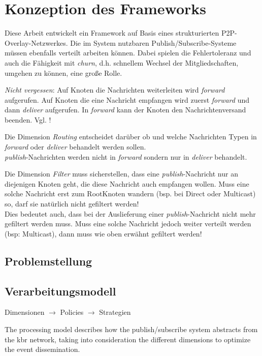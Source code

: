\chapter{Konzeption des Frameworks}
\label{chap:konzeption_pubsub}
Diese Arbeit entwickelt ein Framework auf Basis eines strukturierten P2P-Overlay-Netzwerkes. Die im System nutzbaren Publish/Subscribe-Systeme müssen ebenfalls verteilt arbeiten können. Dabei spielen die Fehlertoleranz und auch die Fähigkeit mit \emph{churn}, d.h. schnellem Wechsel der Mitgliedschaften, umgehen zu können, eine große Rolle.

\emph{Nicht vergessen}: Auf Knoten die Nachrichten weiterleiten wird \emph{forward} aufgerufen. Auf Knoten die eine Nachricht empfangen wird zuerst \emph{forward} und dann \emph{deliver} aufgerufen. In \emph{forward} kann der Knoten den Nachrichtenversand beenden. Vgl. !

Die Dimension \emph{Routing} entscheidet darüber ob und welche Nachrichten Typen in \emph{forward} oder \emph{deliver} behandelt werden sollen.\\
\emph{publish}-Nachrichten werden nicht in \emph{forward} sondern nur in \emph{deliver} behandelt.

Die Dimension \emph{Filter} muss sicherstellen, dass eine \emph{publish}-Nachricht nur an diejenigen Knoten geht, die diese Nachricht auch empfangen wollen. Muss eine solche Nachricht erst zum RootKnoten wandern (bsp. bei Direct oder Multicast) so, darf sie natürlich nicht gefiltert werden!\\
Dies bedeutet auch, dass bei der Auslieferung einer \emph{publish}-Nachricht nicht mehr gefiltert werden muss. Muss eine solche Nachricht jedoch weiter verteilt werden (bsp: Multicast), dann muss wie oben erwähnt gefiltert werden!


\cite{Fischer2010a, Fischer2010Event}


\cite{BeFiMu2006PubSubQoS}
\cite{KostasKatrinis2005}

\section{Problemstellung}

\section{Verarbeitungsmodell}
Dimensionen $\rightarrow$ Policies $\rightarrow$ Strategien

The processing model describes how the publish/subscribe system abstracts from the \ac{kbr} network, taking into consideration the different dimensions to optimize the event dissemination.

